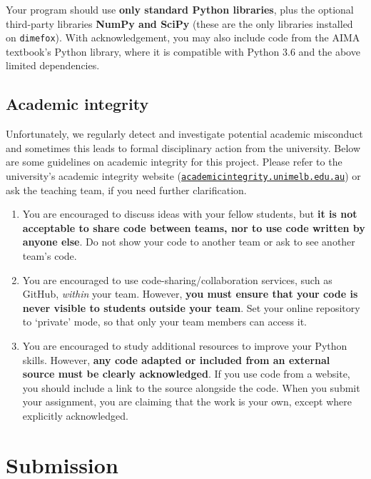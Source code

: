 \documentclass[]{article}
\begin{document}
Your program should use \textbf{only standard Python libraries}, plus the
optional third-party libraries \textbf{NumPy and SciPy}
(these are the only libraries installed on \texttt{dimefox}).
%
With acknowledgement, you may also include code from the AIMA textbook's
Python library, where it is compatible with Python 3.6 and the above
limited dependencies.



\subsection*{Academic integrity}

Unfortunately, we regularly detect and investigate potential academic
misconduct and sometimes this leads to formal disciplinary action from
the university.
%
Below are some guidelines on academic integrity for this project.
%
Please refer to the university's academic integrity website
(\href{https://academicintegrity.unimelb.edu.au}{\texttt{academicintegrity.unimelb.edu.au}})
or ask the teaching team,
if you need further clarification.

\begin{enumerate}
    \item
        You are encouraged to discuss ideas with your fellow students, but
        \textbf{it is not acceptable to share code between teams, nor to
        use code written by anyone else}.
        Do not show your code to another team or ask to see another team's
        code.
    \item
        You are encouraged to use code-sharing/collaboration services,
        such as GitHub, \emph{within} your team.
        However, \textbf{you must ensure that your code is never visible
        to students outside your team}.
        Set your online repository to `private' mode, so that only your
        team members can access it.
    \item
        You are encouraged to study additional resources to improve your
        Python skills.
        However, \textbf{any code adapted or included from an external
        source must be clearly acknowledged}.
        If you use code from a website, you should include a link to the
        source alongside the code.
        When you submit your assignment, you are claiming that the work
        is your own, except where explicitly acknowledged.
\end{enumerate}


\section*{Submission}
\end{document}

